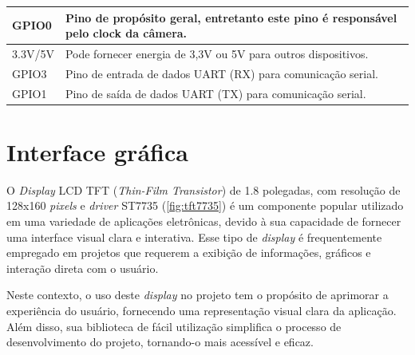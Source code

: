 \begin{tabframed}[htb]
\begin{tabular}{|l|l|}
        GPIO0          & Pino de propósito geral, entretanto este pino é responsável pelo clock da câmera.           \\ \hline
        3.3V/5V        & Pode fornecer energia de 3,3V ou 5V para outros dispositivos.                               \\ \hline
        GPIO3          & Pino de entrada de dados UART (RX) para comunicação serial.                                 \\ \hline
        GPIO1          & Pino de saída de dados UART (TX) para comunicação serial.                                   \\ \hline
    \end{tabular}
    \fonte{}%
\end{tabframed}

\section{Interface gráfica}\label{sec:interface}

O \textit{Display} LCD TFT (\textit{Thin-Film Transistor}) de 1.8 polegadas, 
com resolução de 128x160 \textit{pixels}
e \textit{driver} ST7735 (\autoref{fig:tft7735}) é um componente popular 
utilizado em uma variedade de aplicações eletrônicas, devido à sua 
capacidade de fornecer uma interface visual clara e interativa. 
Esse tipo de \textit{display} é frequentemente empregado em projetos que requerem 
a exibição de informações, gráficos e interação direta com o usuário.

Neste contexto, o uso deste \textit{display} no projeto tem o propósito de aprimorar 
a experiência do usuário, fornecendo uma representação visual clara da 
aplicação. Além disso, sua biblioteca de fácil utilização simplifica o 
processo de desenvolvimento do projeto, tornando-o mais acessível e eficaz.

